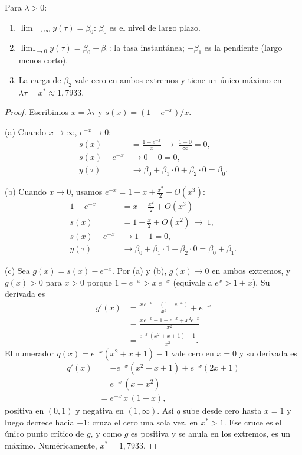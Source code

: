 \begin{proposicion}\label{prop:ns}
Para $\lambda>0$:
\begin{enumerate}[label=(\alph*)]
  \item $\displaystyle\lim_{\tau\to\infty}y(\tau)=\beta_0$: $\beta_0$ es el nivel de largo plazo.
  \item $\displaystyle\lim_{\tau\to0}y(\tau)=\beta_0+\beta_1$: la tasa instantánea; $-\beta_1$ es la pendiente
        (largo menos corto).
  \item La carga de $\beta_2$ vale cero en ambos extremos y tiene un único máximo en $\lambda\tau=x^*\approx1{,}7933$.
\end{enumerate}
\end{proposicion}

\begin{proof}
Escribimos $x=\lambda\tau$ y $s(x)=(1-e^{-x})/x$.

(a) Cuando $x\to\infty$, $e^{-x}\to0$:
\begin{align*}
  s(x) &= \frac{1-e^{-x}}{x}\ \to\ \frac{1-0}{\infty}=0,\\
  s(x)-e^{-x} &\to 0-0=0,\\
  y(\tau) &\to \beta_0+\beta_1\cdot0+\beta_2\cdot0=\beta_0 .
\end{align*}

(b) Cuando $x\to0$, usamos $e^{-x}=1-x+\frac{x^2}{2}+O(x^3)$:
\begin{align*}
  1-e^{-x} &= x-\frac{x^2}{2}+O(x^3)\\
  s(x)     &= 1-\frac{x}{2}+O(x^2)\ \to\ 1,\\
  s(x)-e^{-x} &\to 1-1=0,\\
  y(\tau)  &\to \beta_0+\beta_1\cdot1+\beta_2\cdot0=\beta_0+\beta_1 .
\end{align*}

(c) Sea $g(x)=s(x)-e^{-x}$. Por (a) y (b), $g(x)\to0$ en ambos extremos, y $g(x)>0$ para $x>0$ porque
$1-e^{-x}>x\,e^{-x}$ (equivale a $e^{x}>1+x$). Su derivada es
\begin{align*}
  g'(x) &= \frac{x\,e^{-x}-(1-e^{-x})}{x^2}+e^{-x}\\
        &= \frac{x\,e^{-x}-1+e^{-x}+x^2e^{-x}}{x^2}\\
        &= \frac{e^{-x}\,(x^2+x+1)-1}{x^2}.
\end{align*}
El numerador $q(x)=e^{-x}(x^2+x+1)-1$ vale cero en $x=0$ y su derivada es
\begin{align*}
  q'(x) &= -e^{-x}(x^2+x+1)+e^{-x}(2x+1)\\
        &= e^{-x}\,(x-x^2)\\
        &= e^{-x}\,x\,(1-x),
\end{align*}
positiva en $(0,1)$ y negativa en $(1,\infty)$. Así $q$ sube desde cero hasta $x=1$ y luego decrece hacia $-1$: cruza el
cero una sola vez, en $x^*>1$. Ese cruce es el único punto crítico de $g$, y como $g$ es positiva y se anula en los
extremos, es un máximo. Numéricamente, $x^*=1{,}7933$.
\end{proof}

